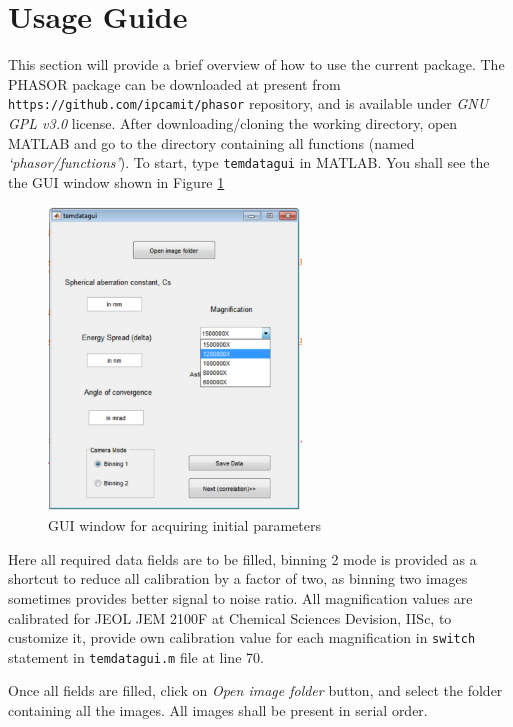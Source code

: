 \section{Usage Guide}
This section will provide a brief overview of how to use the current package.
The PHASOR package can be downloaded at present from \texttt{https://github.com/ipcamit/phasor} repository, and is available under \textit{GNU GPL v3.0} license.
After downloading/cloning the working directory, open MATLAB and go to the directory containing all functions (named \textit{`phasor/functions'}).
To start, type \texttt{temdatagui} in MATLAB.
You shall see the the GUI window shown in Figure \ref{fig:temdatagui}
\begin{figure}
    \centering
    \includegraphics[width=0.6\textwidth]{figures/temdatagui.pdf}
    \caption{GUI window for acquiring initial parameters}
    \label{fig:temdatagui}
\end{figure}

Here all required data fields are to be filled, binning 2 mode is provided as a shortcut to reduce all calibration by a factor of two, as binning two images sometimes provides better signal to noise ratio.
All magnification values are calibrated for JEOL JEM 2100F at Chemical Sciences Devision, IISc, to customize it, provide own calibration value for each magnification in \texttt{switch} statement in \texttt{temdatagui.m} file at line 70.

Once all fields are filled, click on \textit{Open image folder} button, and select the folder containing all the images.
All images shall be present in serial order.

